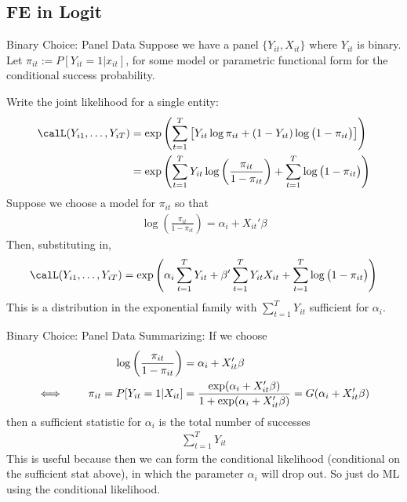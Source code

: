 \documentclass[handout]{beamer}
\newcommand{\sumtT}{\sum^T_{t=1}}
\begin{document}


\subsection{FE in Logit}


\begin{frame}[shrink]{Binary Choice: Panel Data}
Suppose we have a panel $\{Y_{it},X_{it}\}$ where $Y_{it}$ is binary.
Let $\pi_{it} := P[Y_{it}=1|x_{it}]$, for some model or parametric
functional form for the conditional success probability.

Write the joint likelihood for a single entity:
\begin{align*}
  \calL(Y_{i1},\ldots,Y_{iT})
  &=
  \exp\left(
  \sumtT
  \big[
  Y_{it}\log \pi_{it}
  +
  (1-Y_{it})\log\big(1-\pi_{it}\big)
  \big]
  \right)
  \\
  &=
  \exp\left(
  \sumtT
  Y_{it}
  \log\left(\frac{\pi_{it}}{1-\pi_{it}}\right)
  +
  \sumtT
  \log\big(1-\pi_{it}\big)
  \right)
\end{align*}
Suppose we choose a model for $\pi_{it}$ so that
\begin{align*}
  \log\left(\frac{\pi_{it}}{1-\pi_{it}}\right)
  =
  \alpha_i + X_{it}'\beta
\end{align*}
Then, substituting in,
\begin{align*}
  \calL(Y_{i1},\ldots,Y_{iT})
  =
  \exp\left(
  \alpha_i
  \sumtT
  Y_{it}
  +
  \beta'
  \sumtT
  Y_{it} X_{it}
  +
  \sumtT
  \log\big(1-\pi_{it}\big)
  \right)
\end{align*}
This is a distribution in the exponential family with
$\sumtT Y_{it}$ sufficient for $\alpha_i$.
\end{frame}


\begin{frame}[shrink]{Binary Choice: Panel Data}
Summarizing:
If we choose
\begin{align*}
  \log\left(\frac{\pi_{it}}{1-\pi_{it}}\right)
  &=
  \alpha_i + X_{it}'\beta
  \\
  \iff\qquad
  \pi_{it}
  =
  P[Y_{it}=1|X_{it}]
  &=
  \frac{%
    \exp(\alpha_i+X_{it}'\beta)
  }{%
    1+\exp(\alpha_i+X_{it}'\beta)
  }
  =
  G(\alpha_i+X_{it}'\beta)
\end{align*}
then a sufficient statistic for $\alpha_i$ is
the total number of successes
\begin{align*}
  \sumtT
  Y_{it}
\end{align*}
This is useful because then we can form the conditional likelihood
(conditional on the sufficient stat above), in which the parameter
$\alpha_i$ will drop out.
So just do ML using the conditional likelihood.
\end{frame}
\end{document}

